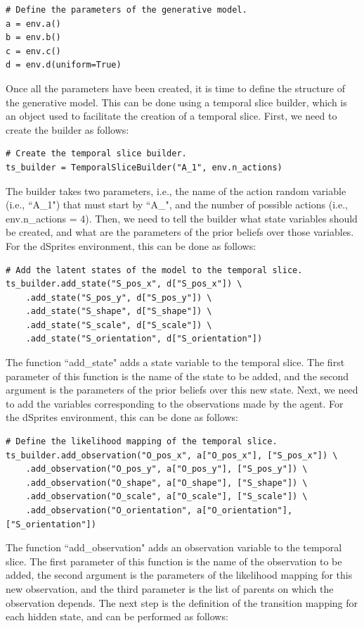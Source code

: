 \documentclass[twoside,11pt]{article}
\begin{document}
\begin{verbatim}
# Define the parameters of the generative model.
a = env.a()
b = env.b()
c = env.c()
d = env.d(uniform=True)
\end{verbatim}
Once all the parameters have been created, it is time to define the structure of the generative model. This can be done using a temporal slice builder, which is an object used to facilitate the creation of a temporal slice. First, we need to create the builder as follows:
\begin{verbatim}
# Create the temporal slice builder.
ts_builder = TemporalSliceBuilder("A_1", env.n_actions)
\end{verbatim}
The builder takes two parameters, i.e., the name of the action random variable (i.e., ``A\_1") that must start by ``A\_", and the number of possible actions (i.e., env.n\_actions = 4). Then, we need to tell the builder what state variables should be created, and what are the parameters of the prior beliefs over those variables. For the dSprites environment, this can be done as follows:
\begin{verbatim}
# Add the latent states of the model to the temporal slice.
ts_builder.add_state("S_pos_x", d["S_pos_x"]) \
    .add_state("S_pos_y", d["S_pos_y"]) \
    .add_state("S_shape", d["S_shape"]) \
    .add_state("S_scale", d["S_scale"]) \
    .add_state("S_orientation", d["S_orientation"])
\end{verbatim}
The function ``add\_state" adds a state variable to the temporal slice. The first parameter of this function is the name of the state to be added, and the second argument is the parameters of the prior beliefs over this new state. Next, we need to add the variables corresponding to the observations made by the agent. For the dSprites environment, this can be done as follows:
\begin{verbatim}
# Define the likelihood mapping of the temporal slice.
ts_builder.add_observation("O_pos_x", a["O_pos_x"], ["S_pos_x"]) \
    .add_observation("O_pos_y", a["O_pos_y"], ["S_pos_y"]) \
    .add_observation("O_shape", a["O_shape"], ["S_shape"]) \
    .add_observation("O_scale", a["O_scale"], ["S_scale"]) \
    .add_observation("O_orientation", a["O_orientation"], ["S_orientation"])
\end{verbatim}
The function ``add\_observation" adds an observation variable to the temporal slice. The first parameter of this function is the name of the observation to be added, the second argument is the parameters of the likelihood mapping for this new observation, and the third parameter is the list of parents on which the observation depends. The next step is the definition of the transition mapping for each hidden state, and can be performed as follows:
\end{document}
